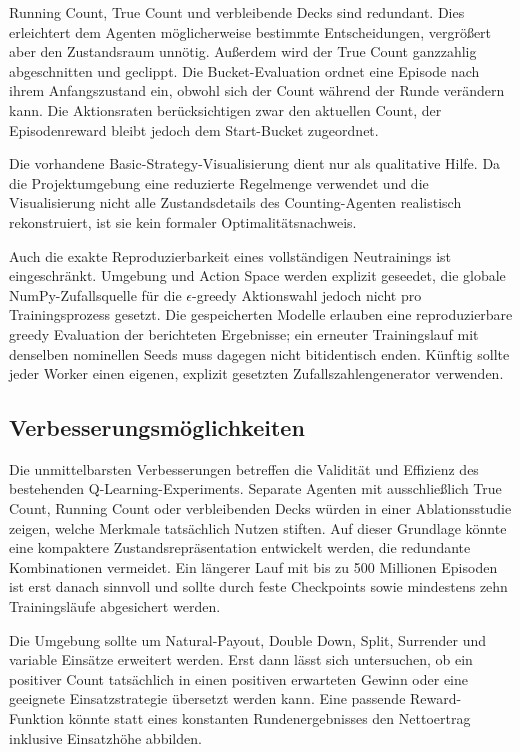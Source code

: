 Running Count, True Count und verbleibende Decks sind redundant. Dies
erleichtert dem Agenten möglicherweise bestimmte Entscheidungen,
vergrößert aber den Zustandsraum unnötig. Außerdem wird der True
Count ganzzahlig abgeschnitten und geclippt. Die Bucket-Evaluation
ordnet eine Episode nach ihrem Anfangszustand ein, obwohl sich der
Count während der Runde verändern kann. Die Aktionsraten
berücksichtigen zwar den aktuellen Count, der Episodenreward bleibt
jedoch dem Start-Bucket zugeordnet.

Die vorhandene Basic-Strategy-Visualisierung dient nur als
qualitative Hilfe. Da die Projektumgebung eine reduzierte Regelmenge
verwendet und die Visualisierung nicht alle Zustandsdetails des
Counting-Agenten realistisch rekonstruiert, ist sie kein formaler
Optimalitätsnachweis.

Auch die exakte Reproduzierbarkeit eines vollständigen Neutrainings
ist eingeschränkt. Umgebung und Action Space werden explizit
geseedet, die globale NumPy-Zufallsquelle für die $\epsilon$-greedy
Aktionswahl jedoch nicht pro Trainingsprozess gesetzt. Die
gespeicherten Modelle erlauben eine reproduzierbare greedy Evaluation
der berichteten Ergebnisse; ein erneuter Trainingslauf mit denselben
nominellen Seeds muss dagegen nicht bitidentisch enden. Künftig
sollte jeder Worker einen eigenen, explizit gesetzten
Zufallszahlengenerator verwenden.

\subsection{Verbesserungsmöglichkeiten}

Die unmittelbarsten Verbesserungen betreffen die Validität und
Effizienz des bestehenden Q-Learning-Experiments. Separate Agenten
mit ausschließlich True Count, Running Count oder verbleibenden Decks
würden in einer Ablationsstudie zeigen, welche Merkmale tatsächlich
Nutzen stiften. Auf dieser Grundlage könnte eine kompaktere
Zustandsrepräsentation entwickelt werden, die redundante
Kombinationen vermeidet. Ein längerer Lauf mit bis zu 500 Millionen
Episoden ist erst danach sinnvoll und sollte durch feste Checkpoints
sowie mindestens zehn Trainingsläufe abgesichert werden.

Die Umgebung sollte um Natural-Payout, Double Down, Split, Surrender
und variable Einsätze erweitert werden. Erst dann lässt sich
untersuchen, ob ein positiver Count tatsächlich in einen positiven
erwarteten Gewinn oder eine geeignete Einsatzstrategie übersetzt
werden kann. Eine passende Reward-Funktion könnte statt eines
konstanten Rundenergebnisses den Nettoertrag inklusive Einsatzhöhe abbilden.

